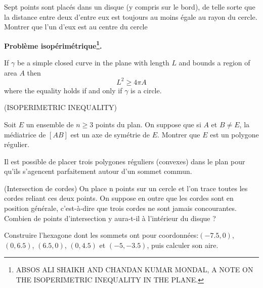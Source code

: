 \begin{example}
Sept points sont placés dans un disque (y compris sur le bord), de telle sorte que la
distance entre deux d’entre eux est toujours au moins égale au rayon du cercle. Montrer que
l’un d’eux est au centre du cercle
\end{example}

\textbf{Problème isopérimétrique\footnote{ABSOS ALI SHAIKH AND CHANDAN KUMAR MONDAL, A NOTE ON THE ISOPERIMETRIC INEQUALITY IN THE PLANE.}.}
\\
\begin{theorem}
If $\gamma$ be a simple closed curve in the plane with length $L$ and bounds a region of area $A$ then
\[
L^{2} \geq 4 \pi A
\]
where the equality holds if and only if $\gamma$ is a circle.
\end{theorem}

\begin{example}{(ISOPERIMETRIC INEQUALITY)}
\end{example}

\begin{exercise}
Soit $E$ un ensemble de $n \geq 3$ points du plan. On suppose que si $A$ et $B \neq E$, la médiatrice
de $\left[AB\right]$ est un axe de symétrie de $E$. Montrer que $E$ est un polygone régulier.
\end{exercise}

\begin{exercise}
Il est possible de placer trois polygones réguliers (convexes) dans le plan pour qu'ils s'agencent parfaitement autour d'un sommet commun.
\end{exercise}

\begin{exercise}{(Intersection de cordes)}
On place n points sur un cercle et l'on trace toutes les cordes reliant ces deux points. On
suppose en outre que les cordes sont en position générale, c'est-à-dire que trois cordes ne
sont jamais concourantes. Combien de points d'intersection y aura-t-il à l'intérieur du disque ?
\end{exercise}

\begin{exercise}
Construire l'hexagone dont les sommets ont pour coordonnées:$\left( -7.5, 0\right)$, $\left( 0, 6.5\right) $, $\left( 6.5, 0\right) $, $\left( 0, 4.5\right)$  et $\left( -5, -3.5\right)$, puis calculer son aire.
\end{exercise}

